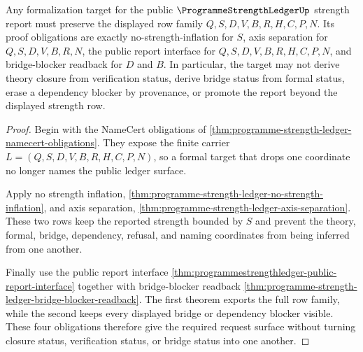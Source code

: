 \begin{theorem}
\label{thm:programme-strength-ledger-formal-target-request}
Any formalization target for the public $\ProgrammeStrengthLedgerUp$ strength report must preserve the displayed row family $Q,S,D,V,B,R,H,C,P,N$. Its proof obligations are exactly no-strength-inflation for $S$, axis separation for $Q,S,D,V,B,R,N$, the public report interface for $Q,S,D,V,B,R,H,C,P,N$, and bridge-blocker readback for $D$ and $B$. In particular, the target may not derive theory closure from verification status, derive bridge status from formal status, erase a dependency blocker by provenance, or promote the report beyond the displayed strength row.
\end{theorem}
\begin{proof}
Begin with the NameCert obligations of \autoref{thm:programme-strength-ledger-namecert-obligations}. They expose the finite carrier $L=(Q,S,D,V,B,R,H,C,P,N)$, so a formal target that drops one coordinate no longer names the public ledger surface.

Apply no strength inflation, \autoref{thm:programme-strength-ledger-no-strength-inflation}, and axis separation, \autoref{thm:programme-strength-ledger-axis-separation}. These two rows keep the reported strength bounded by $S$ and prevent the theory, formal, bridge, dependency, refusal, and naming coordinates from being inferred from one another.

Finally use the public report interface \autoref{thm:programmestrengthledger-public-report-interface} together with bridge-blocker readback \autoref{thm:programme-strength-ledger-bridge-blocker-readback}. The first theorem exports the full row family, while the second keeps every displayed bridge or dependency blocker visible. These four obligations therefore give the required request surface without turning closure status, verification status, or bridge status into one another.
\end{proof}




